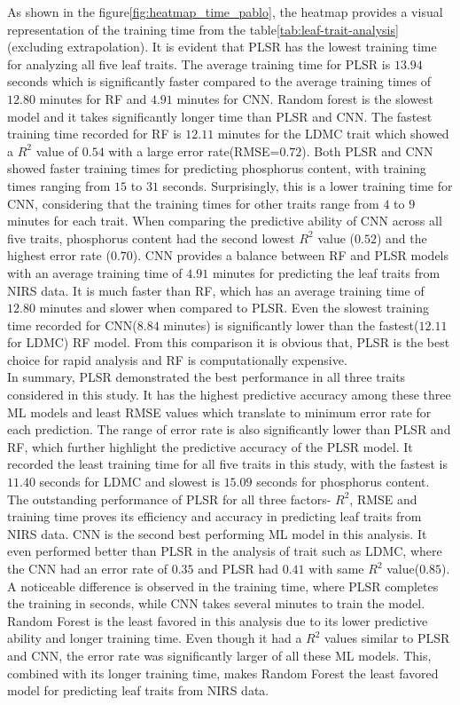 \documentclass[12pt,a4paper]{report}
\begin{document}
As shown in the figure\ref{fig:heatmap_time_pablo}, the heatmap provides a visual representation of the training time from the table\ref{tab:leaf-trait-analysis} (excluding extrapolation). It is evident that PLSR has the lowest training time for analyzing all five leaf traits. The average training time for PLSR is $13.94$ seconds which is significantly faster compared to the average training times of $12.80$ minutes for RF and $4.91$ minutes for CNN. Random forest is the slowest model and it takes significantly longer time than PLSR and CNN. The fastest training time recorded for RF is $12.11$ minutes for the LDMC trait which showed a $R^2$ value of $0.54$ with a large error rate(RMSE=$0.72$). Both PLSR and CNN showed faster training times for predicting phosphorus content, with training times ranging from $15$ to $31$ seconds. Surprisingly, this is a lower training time for CNN, considering that the training times for other traits range from $4$ to $9$ minutes for each trait. When comparing the predictive ability of CNN across all five traits, phosphorus content had the second lowest $R^2$ value ($0.52$) and the highest error rate ($0.70$). CNN provides a balance between RF and PLSR models with an average training time of $4.91$ minutes for predicting the leaf traits from NIRS data. It is much faster than RF, which has an average training time of $12.80$ minutes and slower when compared to PLSR. Even the slowest training time recorded for CNN($8.84$ minutes) is significantly lower than the fastest($12.11$ for LDMC) RF model. From this comparison it is obvious that, PLSR is the best choice for rapid analysis and RF is computationally expensive. \\



In summary, PLSR demonstrated the best performance in all three traits considered in this study. It has the highest predictive accuracy among these three ML models and least RMSE values which translate to minimum error rate for each prediction. The range of error rate is also significantly lower than PLSR and RF, which further highlight the predictive accuracy of the PLSR model. It recorded the least training time for all five traits in this study, with the fastest is $11.40$ seconds for LDMC and slowest is $15.09$ seconds for phosphorus content. The outstanding performance of PLSR for all three factors- $R^2$, RMSE and training time proves its efficiency and accuracy in predicting leaf traits from NIRS data. CNN is the second best performing ML model in this analysis. It even performed better than PLSR in the analysis of trait such as LDMC, where the CNN had an error rate of $0.35$ and PLSR had $0.41$  with same $R^2$ value($0.85$). A noticeable difference is observed in the training time, where PLSR completes the training in seconds, while CNN takes several minutes to train the model. Random Forest is the least favored in this analysis due to its lower predictive ability and longer training time. Even though it had a $R^2$ values similar to PLSR and CNN, the error rate was significantly larger of all these ML models. This, combined with its longer training time, makes Random Forest the least favored model for predicting leaf traits from NIRS data. \\
\end{document}
